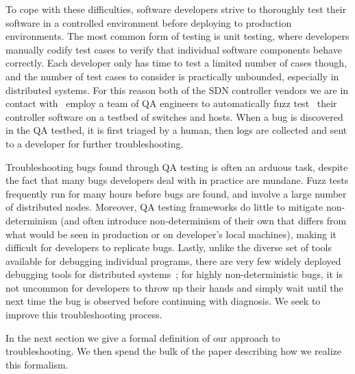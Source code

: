 To cope with these difficulties, software developers strive to thoroughly test
their software in a controlled environment before deploying to
production environments. The most common form of testing is unit testing,
where developers manually codify test cases to verify that individual software
components behave correctly. Each developer only has time to test a limited
number of cases though, and the number of test cases to consider is
practically unbounded, especially in
distributed systems. For this reason both of the SDN controller vendors we are
in contact with~\cite{nicirahomepage,bigswitch} employ a team of QA
engineers to automatically fuzz test~\cite{Miller:1990:ESR:96267.96279} their controller software
on a testbed of switches and hosts.
When a bug is discovered in the QA testbed, it is first triaged
by a human, then logs are collected and sent to a developer for further troubleshooting.

Troubleshooting bugs found through QA testing is often an arduous task,
despite the fact that many bugs developers deal with in practice
are mundane. Fuzz tests frequently run for many hours before bugs are found, and involve
a large number of distributed nodes. Moreover, QA testing frameworks do little to mitigate
non-determinism (and often introduce non-determinism of their own that
differs from what would be seen in production or on developer's local
machines), making it difficult for developers to replicate bugs.
Lastly, unlike the diverse set of tools available for debugging
individual programs, there are very few widely deployed debugging tools for
distributed systems~\cite{tooling_gap}; for highly non-deterministic bugs, it is not
uncommon for developers to throw
up their hands and simply wait until the next time the bug is observed before
continuing with diagnosis. We seek to improve this troubleshooting process.

In the next section we give a formal definition of our approach to
troubleshooting. We then spend
the bulk of the paper describing how we realize this formalism.


